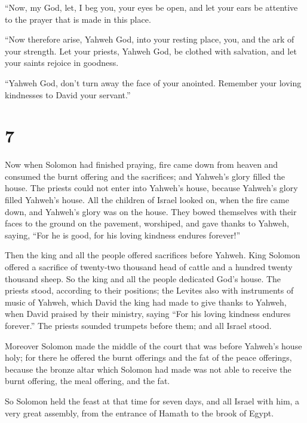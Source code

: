  ``Now, my God, let, I beg you, your eyes be open, and
let your ears be attentive to the prayer that is made in this place.

 ``Now therefore arise, Yahweh God, into your resting
place, you, and the ark of your strength. Let your priests, Yahweh God,
be clothed with salvation, and let your saints rejoice in goodness.

 ``Yahweh God, don't turn away the face of your anointed.
Remember your loving kindnesses to David your servant.''

\hypertarget{section-6}{%
\section{7}\label{section-6}}

 Now when Solomon had finished praying, fire came down
from heaven and consumed the burnt offering and the sacrifices; and
Yahweh's glory filled the house.  The priests could not
enter into Yahweh's house, because Yahweh's glory filled Yahweh's house.
 All the children of Israel looked on, when the fire came
down, and Yahweh's glory was on the house. They bowed themselves with
their faces to the ground on the pavement, worshiped, and gave thanks to
Yahweh, saying, ``For he is good, for his loving kindness endures
forever!''

 Then the king and all the people offered sacrifices
before Yahweh.  King Solomon offered a sacrifice of
twenty-two thousand head of cattle and a hundred twenty thousand sheep.
So the king and all the people dedicated God's house.  The
priests stood, according to their positions; the Levites also with
instruments of music of Yahweh, which David the king had made to give
thanks to Yahweh, when David praised by their ministry, saying ``For his
loving kindness endures forever.'' The priests sounded trumpets before
them; and all Israel stood.

 Moreover Solomon made the middle of the court that was
before Yahweh's house holy; for there he offered the burnt offerings and
the fat of the peace offerings, because the bronze altar which Solomon
had made was not able to receive the burnt offering, the meal offering,
and the fat.

 So Solomon held the feast at that time for seven days,
and all Israel with him, a very great assembly, from the entrance of
Hamath to the brook of Egypt.

